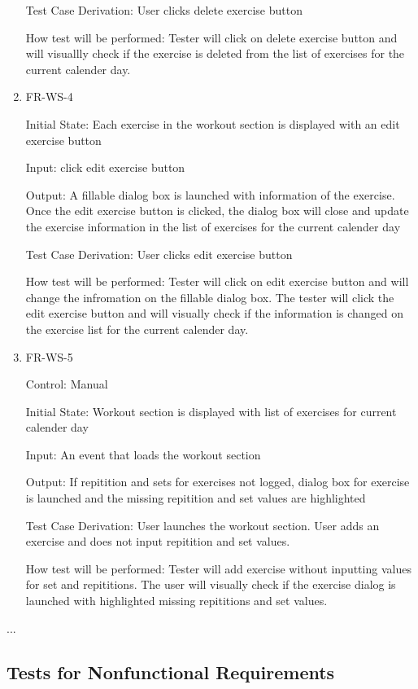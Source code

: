 \documentclass[12pt, titlepage]{article}
\begin{document}
\begin{enumerate}
Test Case Derivation: User clicks delete exercise button

How test will be performed: Tester will click on delete exercise button and will visuallly check if the exercise is deleted from the list of exercises for the current calender day. 

\item{FR-WS-4\\}

Initial State: Each exercise in the workout section is displayed with an edit exercise button
					
Input: click edit exercise button
					
Output: A fillable dialog box is launched with information of the exercise. Once the edit exercise button is clicked, the dialog box will close and update the exercise information in the list of exercises for the current calender day

Test Case Derivation: User clicks edit exercise button

How test will be performed: Tester will click on edit exercise button and will change the infromation on the fillable dialog box. The tester will click the edit exercise button and will visually check if the information is changed on the exercise list for the current calender day.

\item{FR-WS-5\\}

Control: Manual
					
Initial State: Workout section is displayed with list of exercises for current calender day
					
Input: An event that loads the workout section
					
Output: If repitition and sets for exercises not logged, dialog box for exercise is launched and the missing repitition and set values are highlighted

Test Case Derivation: User launches the workout section. User adds an exercise and does not input repitition and set values.

How test will be performed: Tester will add exercise without inputting values for set and repititions. The user will visually check if the exercise dialog is launched with highlighted missing repititions and set values.


\end{enumerate}

...

\subsection{Tests for Nonfunctional Requirements}
\end{document}
